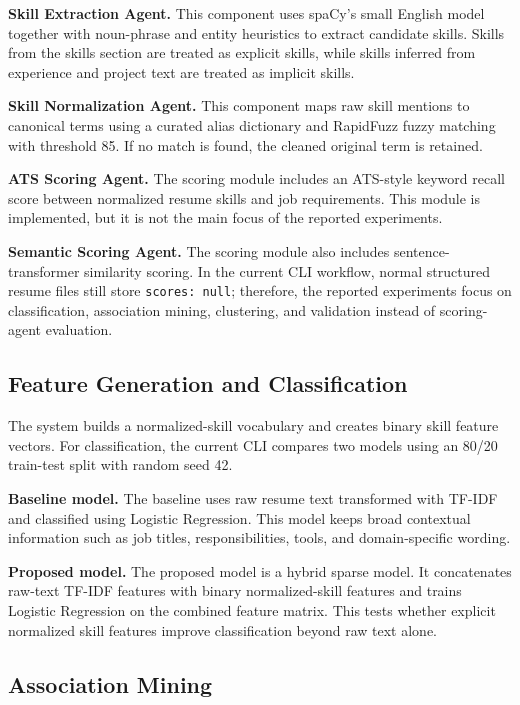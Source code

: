 \documentclass[sigconf, authorversion, nonacm]{acmart}
\begin{document}
\textbf{Skill Extraction Agent.} This component uses spaCy's small English model together with noun-phrase and entity heuristics to extract candidate skills. Skills from the skills section are treated as explicit skills, while skills inferred from experience and project text are treated as implicit skills.

\textbf{Skill Normalization Agent.} This component maps raw skill mentions to canonical terms using a curated alias dictionary and RapidFuzz fuzzy matching with threshold 85. If no match is found, the cleaned original term is retained.

\textbf{ATS Scoring Agent.} The scoring module includes an ATS-style keyword recall score between normalized resume skills and job requirements. This module is implemented, but it is not the main focus of the reported experiments.

\textbf{Semantic Scoring Agent.} The scoring module also includes sentence-transformer similarity scoring. In the current CLI workflow, normal structured resume files still store \texttt{scores: null}; therefore, the reported experiments focus on classification, association mining, clustering, and validation instead of scoring-agent evaluation.

\subsection{Feature Generation and Classification}

The system builds a normalized-skill vocabulary and creates binary skill feature vectors. For classification, the current CLI compares two models using an 80/20 train-test split with random seed 42.

\textbf{Baseline model.} The baseline uses raw resume text transformed with TF-IDF and classified using Logistic Regression. This model keeps broad contextual information such as job titles, responsibilities, tools, and domain-specific wording.

\textbf{Proposed model.} The proposed model is a hybrid sparse model. It concatenates raw-text TF-IDF features with binary normalized-skill features and trains Logistic Regression on the combined feature matrix. This tests whether explicit normalized skill features improve classification beyond raw text alone.

\subsection{Association Mining}
\end{document}
